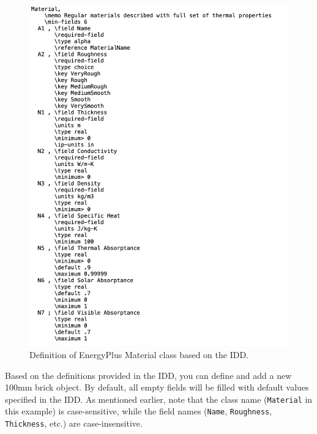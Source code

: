 \documentclass[
]{book}
\begin{document}
\begin{figure}

{\centering \includegraphics[width=0.7\linewidth]{figures/idd_material} 

}

\caption{Definition of EnergyPlus Material class based on the IDD.}\label{fig:idd-material}
\end{figure}

Based on the definitions provided in the IDD, you can define and add a new 100mm brick object. By default, all empty fields will be filled with default values specified in the IDD. As mentioned earlier, note that the class name (\texttt{Material} in this example) is case-sensitive, while the field names (\texttt{Name}, \texttt{Roughness}, \texttt{Thickness}, etc.) are case-insensitive.
\end{document}
